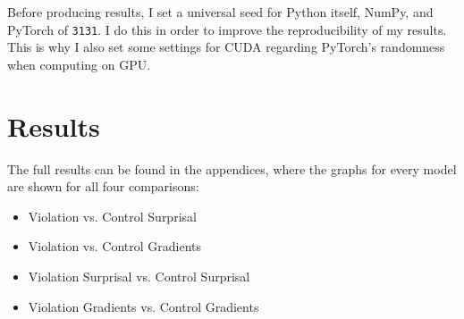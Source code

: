 \documentclass{IEEEtran}
\begin{document}
Before producing results, I set a universal seed for Python itself, NumPy, and PyTorch of \texttt{3131}.
I do this in order to improve the reproducibility of my results.
This is why I also set some settings for CUDA regarding PyTorch's randomness when computing on GPU.

\section{Results}

The full results can be found in the appendices, where the graphs for every model are shown for all four comparisons:
\begin{itemize}
    \item Violation vs. Control Surprisal
    \item Violation vs. Control Gradients
    \item Violation Surprisal vs. Control Surprisal
    \item Violation Gradients vs. Control Gradients
\end{itemize}
\end{document}

